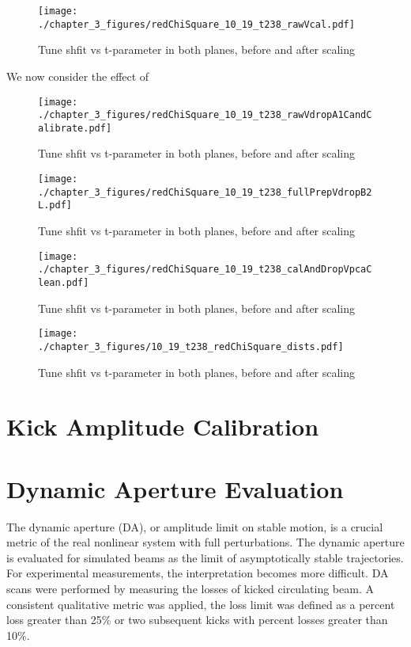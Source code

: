 \begin{figure}
    \centering
    \texttt{[image: ./chapter\_3\_figures/redChiSquare\_10\_19\_t238\_rawVcal.pdf]}
    \caption{Tune shfit vs t-parameter in both planes, before and after scaling}
    \label{fig:rawVcal}
\end{figure}

We now consider the effect of 

\begin{figure}
    \centering
    \texttt{[image: ./chapter\_3\_figures/redChiSquare\_10\_19\_t238\_rawVdropA1CandCalibrate.pdf]}
    \caption{Tune shfit vs t-parameter in both planes, before and after scaling}
    \label{fig:rawVA1C}
\end{figure}

\begin{figure}
    \centering
    \texttt{[image: ./chapter\_3\_figures/redChiSquare\_10\_19\_t238\_fullPrepVdropB2L.pdf]}
    \caption{Tune shfit vs t-parameter in both planes, before and after scaling}
    \label{fig:prepVB2L}
\end{figure}


\begin{figure}
    \centering
    \texttt{[image: ./chapter\_3\_figures/redChiSquare\_10\_19\_t238\_calAndDropVpcaClean.pdf]}
    \caption{Tune shfit vs t-parameter in both planes, before and after scaling}
    \label{fig:calVpca}
\end{figure}

\begin{figure}
    \centering
    \texttt{[image: ./chapter\_3\_figures/10\_19\_t238\_redChiSquare\_dists.pdf]}
    \caption{Tune shfit vs t-parameter in both planes, before and after scaling}
    \label{fig:redChiDists}
\end{figure}



\section{Kick Amplitude Calibration} \label{sec:kickAmpCal}

\section{Dynamic Aperture Evaluation} \label{sec:daEval}
The dynamic aperture (DA), or amplitude limit on stable motion, is a crucial metric of the real nonlinear system with full perturbations. The dynamic aperture is evaluated for simulated beams as the limit of asymptotically stable trajectories. For experimental measurements, the interpretation becomes more difficult. DA scans were performed by measuring the losses of kicked circulating beam. A consistent qualitative metric was applied, the loss limit was defined as a percent loss greater than 25\% or two subsequent kicks with percent losses greater than 10\%.

